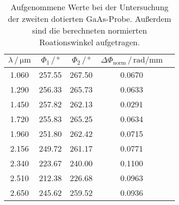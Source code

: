    \begin{table}[H]
    \centering
    \caption{Aufgenommene Werte bei der Untersuchung der zweiten dotierten GaAs-Probe. Außerdem sind die
    berechneten normierten Roationswinkel aufgetragen.}
    \label{tab:tab:Probe2}
    \begin{tabular}{ccccc}
      \toprule
      $\lambda\, / \, \si{\micro\meter}$ & $\Phi_1 \, / \, \si{\degree}$ & $\Phi_2 \, / \, \si{\degree}$ & $\Delta\Phi_\text{norm} \, / \, \si{\radian\per\milli\meter}$  \\
      \midrule
      \num{1.060} & \num{257.55} & \num{267.50} & \num{0.0670} \\
      \num{1.290} & \num{256.33} & \num{265.73} & \num{0.0633} \\
      \num{1.450} & \num{257.82} & \num{262.13} & \num{0.0291} \\
      \num{1.720} & \num{255.83} & \num{265.25} & \num{0.0634} \\
      \num{1.960} & \num{251.80} & \num{262.42} & \num{0.0715} \\
      \num{2.156} & \num{249.72} & \num{261.17} & \num{0.0771} \\
      \num{2.340} & \num{223.67} & \num{240.00} & \num{0.1100} \\
      \num{2.510} & \num{212.38} & \num{226.68} & \num{0.0963} \\
      \num{2.650} & \num{245.62} & \num{259.52} & \num{0.0936} \\
      \bottomrule
    \end{tabular}
   \end{table} \noindent

